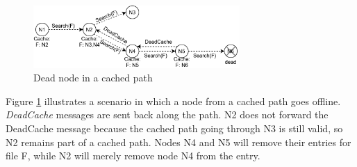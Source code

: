 \begin{figure}
    \centering
    \includegraphics[width=0.7\textwidth]{figures/fig6}
    \caption{Dead node in a cached path}
    \label{fig:fig6}
\end{figure}

Figure \ref{fig:fig6} illustrates a scenario in which a node from a cached path 
goes offline. \textit{DeadCache} messages are sent back along the path. N2 does 
not forward the DeadCache message because the cached path going through N3 is 
still valid, so N2 remains part of a cached path. Nodes N4 and N5 will remove 
their entries for file F, while N2 will merely remove node N4 from the entry.

